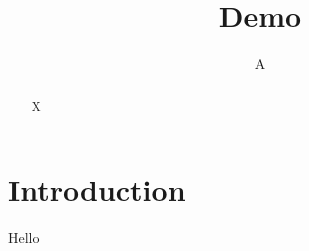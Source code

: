 \documentclass{article}
\title{Demo}
\author{A}
\begin{document}
\maketitle
\begin{abstract}X\end{abstract}
\section{Introduction}
Hello
\end{document}
